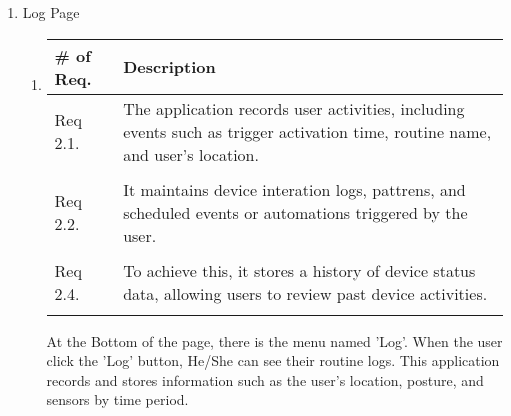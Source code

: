 \begin{enumerate}[label=\arabic*.]
\begin{enumerate}[label*={\arabic*.},ref=\theenumi.\arabic*]
                    
          \end{enumerate}

    \item {\large{Log Page}}
          \begin{enumerate}[label*={\arabic*.},ref=\theenumi.\arabic*]
              \setlength{\itemindent}{0.5cm}
              \item
                    \begin{table}[H]
                        \center
                        \begin{tabular}{m{1.4cm} m{5.5cm}}
                            \toprule
                            \# of Req. & Description                                                                                                                   \\
                            \midrule
                            Req 2.1.   & The application records user activities, including events such as trigger activation time, routine name, and user's location. \\\\
                            Req 2.2.   & It maintains device interation logs, pattrens, and scheduled events or automations triggered by the user.                     \\\\
                            Req 2.4.   & To achieve this, it stores a history of device status data, allowing users to review past device activities.                  \\\\
                            \bottomrule
                        \end{tabular}
                    \end{table}
                    At the Bottom of the page, there is the menu named 'Log'. When the user click the 'Log' button, He/She can see their routine logs. This application records and stores information such as the user's location, posture, and sensors by time period. \\\\

          \end{enumerate}


\end{enumerate}
